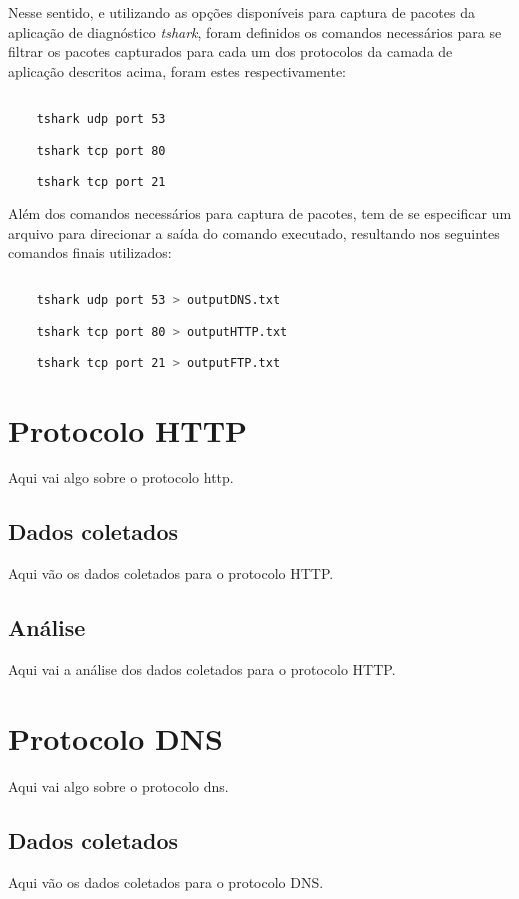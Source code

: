 \documentclass[a4paper]{report} %
\begin{document}
	Nesse sentido, e utilizando as opções disponíveis para captura de pacotes da aplicação de diagnóstico \textit{tshark}, foram definidos os comandos necessários para se filtrar os pacotes capturados para cada um dos protocolos da camada de aplicação descritos acima, foram estes respectivamente:
\begin{lstlisting}[language=bash]

	tshark udp port 53

	tshark tcp port 80

	tshark tcp port 21

\end{lstlisting}

	Além dos comandos necessários para captura de pacotes, tem de se especificar um arquivo para direcionar a saída do comando executado, resultando nos seguintes comandos finais utilizados:
\begin{lstlisting}[language=bash]

	tshark udp port 53 > outputDNS.txt

	tshark tcp port 80 > outputHTTP.txt

	tshark tcp port 21 > outputFTP.txt

\end{lstlisting}

\section{Protocolo HTTP}
\label{sec_http}
Aqui vai algo sobre o protocolo http.
\subsection{Dados coletados}
\label{sub_http_dados}
Aqui vão os dados coletados para o protocolo HTTP.

\subsection{Análise}
\label{sub_http_analise}
Aqui vai a análise dos dados coletados para o protocolo HTTP.

\section{Protocolo DNS}
\label{sec_dns}
Aqui vai algo sobre o protocolo dns.
\subsection{Dados coletados}
\label{sub_dns_dados}
Aqui vão os dados coletados para o protocolo DNS.
\end{document}
